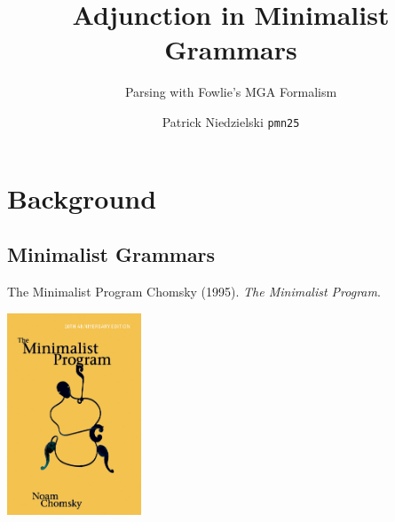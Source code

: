 \documentclass{beamer}
\title[ Parsing MGAs ]{ Adjunction in Minimalist Grammars }
\subtitle{ Parsing with Fowlie's MGA Formalism }
\author[ \texttt{pmn25} ]{ Patrick Niedzielski \texttt{pmn25} }
\begin{document}
\begin{frame}
  \titlepage
\end{frame}

\AtBeginSection[]
{
\begin{frame}{}
\tableofcontents[currentsection]
\end{frame}
}

\section{Background}
\subsection{Minimalist Grammars}

\begin{frame}{The Minimalist Program}
  Chomsky (1995). \textit{The Minimalist Program}.
  
  \begin{center}
    \includegraphics[width=0.3\textwidth]{minimalist-program}
  \end{center}
\end{frame}
\end{document}
